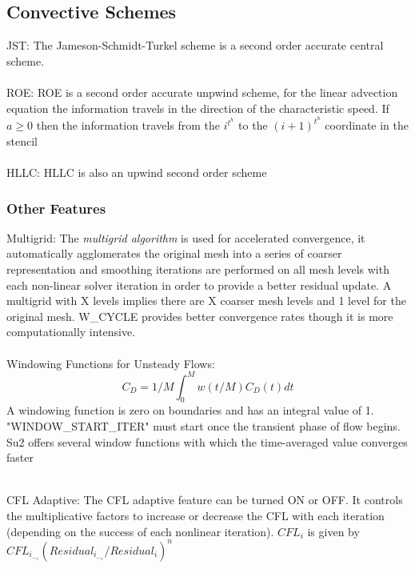 \subsection{Convective Schemes}
JST: The Jameson-Schmidt-Turkel scheme is a second order accurate central scheme. \\
\\
ROE: ROE is a second order accurate unpwind scheme, for the linear advection equation the information travels in the direction of the characteristic speed. If $a \geq 0$ then the information travels from the $i^t^h$ to the $(i+1)^t^h$ coordinate in the stencil \\
\\
HLLC: HLLC is also an upwind second order scheme\\
\subsubsection{Other Features}
Multigrid:
The {\textit{multigrid algorithm}} is used for accelerated convergence, it automatically agglomerates the original mesh into a series of coarser representation and smoothing iterations are performed on all mesh levels with each non-linear solver iteration in order to provide a better residual update. A multigrid with X levels implies there are X coarser mesh levels and 1 level for the original mesh. {W\_CYCLE} provides better convergence rates though it is more computationally intensive.\\
\\
Windowing Functions for Unsteady Flows:\\
\begin{equation}
        C_D = 1/M\int_{0}^{M}w(t/M)C_D(t) dt 
    \end{equation}
    A windowing function is zero on boundaries and has an integral value of 1.  "WINDOW\_START\_ITER" must start once the transient phase of flow begins. Su2 offers several window functions with which the time-averaged value converges faster
\begin{table}[ht]
        \centering
        \caption{Windowing Functions}
        \label{tab:Windowing Functions}
\end{table}\\
CFL Adaptive:
The CFL adaptive feature can be turned ON or OFF. It controls the multiplicative factors to increase or decrease the CFL with each iteration (depending on the success of each nonlinear iteration). $CFL_i$ is given by $CFL_i_-_1(Residual_i_-_1/Residual_i)^n$
\newpage